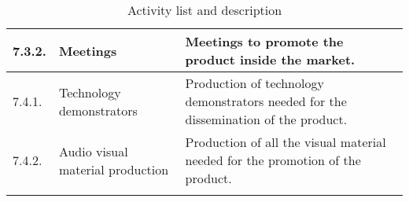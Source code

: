 \begin{longtable}[H]{l >{\raggedright\arraybackslash}p{4cm} p{8cm}}
	\midrule
	
	7.3.2. & Meetings & Meetings to promote the product inside the market.\vspace{0.2cm} \\
	
	\midrule

	7.4.1. & Technology demonstrators & Production of technology demonstrators needed for the dissemination of the product.\vspace{0.2cm} \\
	
	\midrule
	
	7.4.2. & Audio visual material production & Production of all the visual material needed for the promotion of the product.\vspace{0.2cm} \\
	
	\bottomrule[2pt]
	
	\caption{Activity list and description}
\end{longtable}